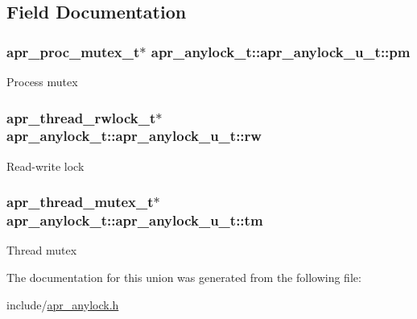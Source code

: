 \subsection{Field Documentation}
\hypertarget{unionapr__anylock__t_1_1apr__anylock__u__t_aeb1a5d1e7a4e326482983ea956caae42}{
\subsubsection[{pm}]{\setlength{\rightskip}{0pt plus 5cm}apr\-\_\-proc\-\_\-mutex\-\_\-t$\ast$ apr\-\_\-anylock\-\_\-t\-::apr\-\_\-anylock\-\_\-u\-\_\-t\-::pm}}\label{unionapr__anylock__t_1_1apr__anylock__u__t_aeb1a5d1e7a4e326482983ea956caae42}
Process mutex \hypertarget{unionapr__anylock__t_1_1apr__anylock__u__t_a7d876bf9eda2835ba357a25c98b095b2}{
\subsubsection[{rw}]{\setlength{\rightskip}{0pt plus 5cm}apr\-\_\-thread\-\_\-rwlock\-\_\-t$\ast$ apr\-\_\-anylock\-\_\-t\-::apr\-\_\-anylock\-\_\-u\-\_\-t\-::rw}}\label{unionapr__anylock__t_1_1apr__anylock__u__t_a7d876bf9eda2835ba357a25c98b095b2}
Read-\/write lock \hypertarget{unionapr__anylock__t_1_1apr__anylock__u__t_af08254c9ff8d2152276040037cd8ee53}{
\subsubsection[{tm}]{\setlength{\rightskip}{0pt plus 5cm}apr\-\_\-thread\-\_\-mutex\-\_\-t$\ast$ apr\-\_\-anylock\-\_\-t\-::apr\-\_\-anylock\-\_\-u\-\_\-t\-::tm}}\label{unionapr__anylock__t_1_1apr__anylock__u__t_af08254c9ff8d2152276040037cd8ee53}
Thread mutex 

The documentation for this union was generated from the following file\-:\begin{DoxyCompactItemize}
\item 
include/\hyperlink{apr__anylock_8h}{apr\-\_\-anylock.\-h}\end{DoxyCompactItemize}
